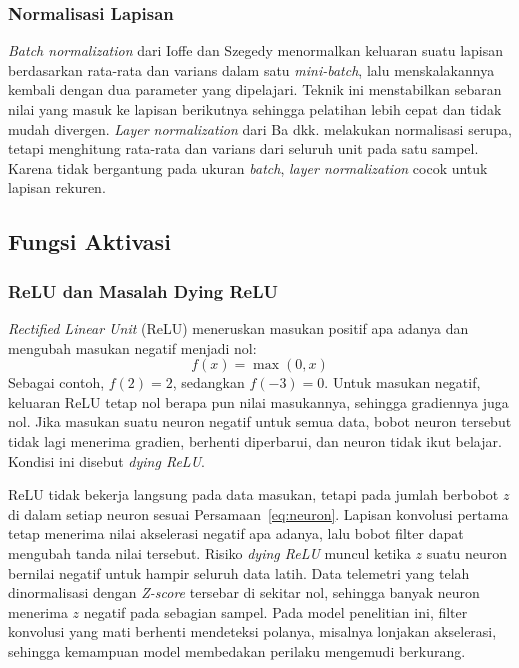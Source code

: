 \subsubsection{Normalisasi Lapisan}
\textit{Batch normalization} dari Ioffe dan Szegedy menormalkan keluaran suatu lapisan berdasarkan rata-rata dan varians dalam satu \textit{mini-batch}, lalu menskalakannya kembali dengan dua parameter yang dipelajari. Teknik ini menstabilkan sebaran nilai yang masuk ke lapisan berikutnya sehingga pelatihan lebih cepat dan tidak mudah divergen. \textit{Layer normalization} dari Ba dkk. melakukan normalisasi serupa, tetapi menghitung rata-rata dan varians dari seluruh unit pada satu sampel. Karena tidak bergantung pada ukuran \textit{batch}, \textit{layer normalization} cocok untuk lapisan rekuren.

\subsection{Fungsi Aktivasi}
\subsubsection{ReLU dan Masalah Dying ReLU}
\textit{Rectified Linear Unit} (ReLU) meneruskan masukan positif apa adanya dan mengubah masukan negatif menjadi nol:
\begin{equation}
  f(x) = \max(0, x)
  \label{eq:relu}
\end{equation}
Sebagai contoh, $f(2) = 2$, sedangkan $f(-3) = 0$. Untuk masukan negatif, keluaran ReLU tetap nol berapa pun nilai masukannya, sehingga gradiennya juga nol. Jika masukan suatu neuron negatif untuk semua data, bobot neuron tersebut tidak lagi menerima gradien, berhenti diperbarui, dan neuron tidak ikut belajar. Kondisi ini disebut \textit{dying ReLU}.

ReLU tidak bekerja langsung pada data masukan, tetapi pada jumlah berbobot $z$ di dalam setiap neuron sesuai Persamaan~\ref{eq:neuron}. Lapisan konvolusi pertama tetap menerima nilai akselerasi negatif apa adanya, lalu bobot filter dapat mengubah tanda nilai tersebut. Risiko \textit{dying ReLU} muncul ketika $z$ suatu neuron bernilai negatif untuk hampir seluruh data latih. Data telemetri yang telah dinormalisasi dengan \textit{Z-score} tersebar di sekitar nol, sehingga banyak neuron menerima $z$ negatif pada sebagian sampel. Pada model penelitian ini, filter konvolusi yang mati berhenti mendeteksi polanya, misalnya lonjakan akselerasi, sehingga kemampuan model membedakan perilaku mengemudi berkurang.

